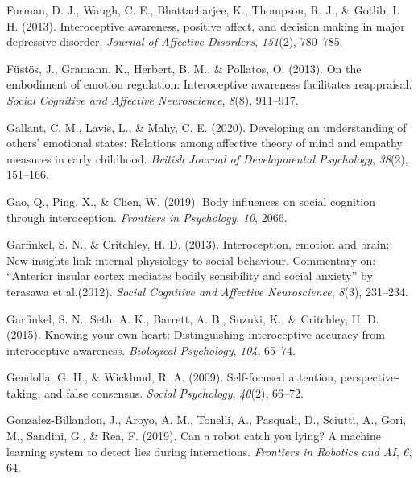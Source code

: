 \documentclass[
  man,mask,floatsintext]{apa6}
\newlength{\cslhangindent}
\newlength{\cslentryspacingunit} %
\newenvironment{CSLReferences}[2] %
 {%
  \setlength{\parindent}{0pt}
  \ifodd #1
  \let\oldpar\par
  \def\par{\hangindent=\cslhangindent\oldpar}
  \fi
  \setlength{\parskip}{#2\cslentryspacingunit}
 }%
 {}
\begin{document}
\begin{CSLReferences}{1}{0}
\leavevmode{}%
Furman, D. J., Waugh, C. E., Bhattacharjee, K., Thompson, R. J., \& Gotlib, I. H. (2013). Interoceptive awareness, positive affect, and decision making in major depressive disorder. \emph{Journal of Affective Disorders}, \emph{151}(2), 780--785.

\leavevmode{}%
Füstös, J., Gramann, K., Herbert, B. M., \& Pollatos, O. (2013). On the embodiment of emotion regulation: Interoceptive awareness facilitates reappraisal. \emph{Social Cognitive and Affective Neuroscience}, \emph{8}(8), 911--917.

\leavevmode{}%
Gallant, C. M., Lavis, L., \& Mahy, C. E. (2020). Developing an understanding of others' emotional states: Relations among affective theory of mind and empathy measures in early childhood. \emph{British Journal of Developmental Psychology}, \emph{38}(2), 151--166.

\leavevmode{}%
Gao, Q., Ping, X., \& Chen, W. (2019). Body influences on social cognition through interoception. \emph{Frontiers in Psychology}, \emph{10}, 2066.

\leavevmode{}%
Garfinkel, S. N., \& Critchley, H. D. (2013). Interoception, emotion and brain: New insights link internal physiology to social behaviour. Commentary on: {``Anterior insular cortex mediates bodily sensibility and social anxiety''} by terasawa et al.(2012). \emph{Social Cognitive and Affective Neuroscience}, \emph{8}(3), 231--234.

\leavevmode{}%
Garfinkel, S. N., Seth, A. K., Barrett, A. B., Suzuki, K., \& Critchley, H. D. (2015). Knowing your own heart: Distinguishing interoceptive accuracy from interoceptive awareness. \emph{Biological Psychology}, \emph{104}, 65--74.

\leavevmode{}%
Gendolla, G. H., \& Wicklund, R. A. (2009). Self-focused attention, perspective-taking, and false consensus. \emph{Social Psychology}, \emph{40}(2), 66--72.

\leavevmode{}%
Gonzalez-Billandon, J., Aroyo, A. M., Tonelli, A., Pasquali, D., Sciutti, A., Gori, M., Sandini, G., \& Rea, F. (2019). Can a robot catch you lying? A machine learning system to detect lies during interactions. \emph{Frontiers in Robotics and AI}, \emph{6}, 64.


\end{CSLReferences}
\end{document}

